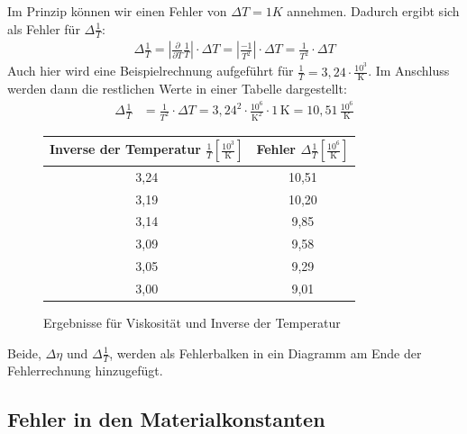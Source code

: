 \documentclass[fontsize=12pt]{scrartcl}
\renewcommand{\l}{\left\vert}
\renewcommand{\r}{\right\vert}
\begin{document}
Im Prinzip können wir einen Fehler von $\Delta T=1K$ annehmen. Dadurch ergibt sich als Fehler für $\Delta\frac{1}{T}$:
\begin{align*}
\Delta\frac{1}{T}= \l \frac{\partial}{\partial T} \frac{1}{T} \r \cdot \Delta T = \l \frac{-1}{T^2} \r \cdot \Delta T =  \frac{1}{T^2} \cdot \Delta T
\end{align*}
Auch hier wird eine Beispielrechnung aufgeführt für $\frac{1}{T}=3,24\cdot \frac{10^3}{\text{K}}$. Im Anschluss werden dann die restlichen Werte in einer Tabelle dargestellt:
\begin{align*}
\Delta\frac{1}{T}&=  \frac{1}{T^2} \cdot \Delta T
= 3,24^2\cdot \frac{10^6}{\text{K}^2} \cdot 1\,\text{K}
=10,51\,\frac{10^6}{\text{K}}
\end{align*}
 \begin{figure}[H]
 \vspace{-12pt}
\centering
\caption{Ergebnisse für Viskosität und Inverse der Temperatur}
\begin{tabular}{|c|c|} \hline
\rule{0pt}{12pt} Inverse der Temperatur $ \frac{1}{T} [\frac{10^3}{\text{K}}] $& Fehler $\Delta\frac{1}{T} [\frac{10^6}{\text{K}}]$ \\ \hline
3,24	&10,51 \\ \hline
3,19	&10,20 \\ \hline
3,14	&9,85 \\ \hline
3,09	&9,58 \\ \hline
3,05	&9,29 \\ \hline
3,00	&9,01 \\ \hline
\end{tabular}				
\end{figure}
Beide, $\Delta\eta$ und $\Delta\frac{1}{T}$, werden als Fehlerbalken in ein Diagramm am Ende der Fehlerrechnung hinzugefügt.

\subsection{Fehler in den Materialkonstanten}
\end{document}
